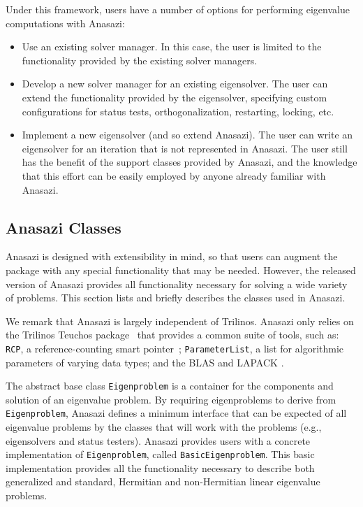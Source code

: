 \documentclass[acmtoms]{acmtrans2m}
\newcounter{algorithm}
\newcommand{\aspace}[1]{\texttt{#1}}
\begin{document}
Under this framework, users have a number of options for performing eigenvalue
computations with Anasazi:
\begin{itemize}
\item
Use an existing solver manager. In this case, the user is limited to
the functionality provided by the existing solver managers.
\item
Develop a new solver manager for an existing eigensolver.
The user can extend the functionality provided by the eigensolver,
specifying custom configurations for status tests,
orthogonalization, restarting, locking,  etc.
\item
Implement a new eigensolver (and so extend Anasazi). The user can
write an eigensolver for an iteration that is not represented in
Anasazi. The user still has the benefit of the support classes
provided by Anasazi, and the knowledge that this effort can be
easily employed by anyone already familiar with Anasazi.
\end{itemize}


\subsection{Anasazi Classes}
\label{subsec:anasazi:classes}

Anasazi is designed with extensibility in mind, so that users can
augment the package with any special functionality that may be
needed. However, the released version of Anasazi provides all
functionality necessary for solving a wide variety of problems. This
section lists and briefly describes the classes used in Anasazi.


We remark that Anasazi is largely independent of Trilinos. Anasazi
only relies on the Trilinos Teuchos package~\cite{Trilinos:Teuchos}
that provides a common suite of tools, such as: \texttt{RCP},
a reference-counting smart pointer~\cite{Detlefs:1992:GCR};
\texttt{ParameterList}, a list for algorithmic parameters of
varying data types; and the BLAS
\cite{Lawson:1979:BLA,Blackford:2002:USB} and LAPACK \cite{abbd:95}.

The abstract base class \aspace{Eigenproblem} is a container for the components and
solution of an eigenvalue problem. By requiring eigenproblems to derive from
\aspace{Eigenproblem}, Anasazi defines a minimum interface that can be expected of all
eigenvalue problems by the classes that will work with the problems (e.g., eigensolvers
and status testers). Anasazi provides users with a concrete implementation of
\aspace{Eigenproblem}, called \aspace{BasicEigenproblem}. This basic implementation
provides all the functionality necessary to describe both generalized and standard,
Hermitian and non-Hermitian linear eigenvalue problems.
\end{document}

